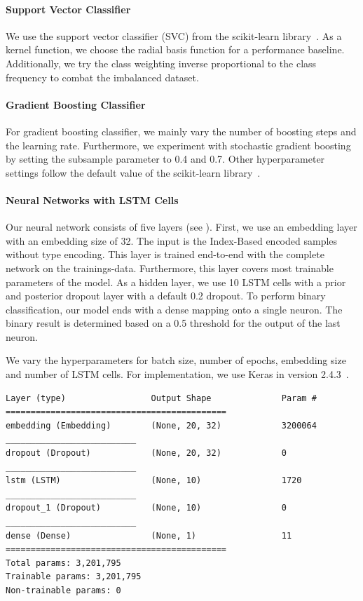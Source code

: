 \paragraph{Support Vector Classifier}
We use the support vector classifier (SVC) from the scikit-learn library~\cite{scikit-learn}. As a kernel function, we choose the radial basis function for a performance baseline. Additionally, we try the class weighting inverse proportional to the class frequency to combat the imbalanced dataset.
\paragraph{Gradient Boosting Classifier}
For gradient boosting classifier, we mainly vary the number of boosting steps and the learning rate. Furthermore, we experiment with stochastic gradient boosting by setting the subsample parameter to 0.4 and 0.7. Other hyperparameter settings follow the default value of the scikit-learn library~\cite{scikit-learn}.
\paragraph{Neural Networks with LSTM Cells}
Our neural network consists of five layers (see ). First, we use an embedding layer with an embedding size of 32. The input is the Index-Based encoded samples without type encoding. This layer is trained end-to-end with the complete network on the trainings-data. Furthermore, this layer covers most trainable parameters of the model. As a hidden layer, we use 10 LSTM cells with a prior and posterior dropout layer with a default 0.2 dropout. To perform binary classification, our model ends with a dense mapping onto a single neuron. The binary result is determined based on a 0.5 threshold for the output of the last neuron.

We vary the hyperparameters for batch size, number of epochs, embedding size and number of LSTM cells. For implementation, we use Keras in version 2.4.3~\cite{chollet2015keras}.

\begin{lstlisting}[float=t, label=lst:lstm, caption={Summary of our LSTM network. We use an embedding layer of size 32, 10 LSTM cells, a dropout layer before and after the LSTM layer with a default dropout ratio of 0.2 and a dense mapping to a single output neuron for binary classification with a threshold of 0.5.}]
Layer (type)                 Output Shape              Param #
============================================
embedding (Embedding)        (None, 20, 32)            3200064
__________________________
dropout (Dropout)            (None, 20, 32)            0
__________________________
lstm (LSTM)                  (None, 10)                1720
__________________________
dropout_1 (Dropout)          (None, 10)                0
__________________________
dense (Dense)                (None, 1)                 11
============================================
Total params: 3,201,795
Trainable params: 3,201,795
Non-trainable params: 0\end{lstlisting}